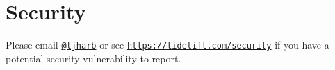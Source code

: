 \chapter{Security }
\hypertarget{md__c_1_2_users_2saket_2_one_drive_2_desktop_2e_pathshala_2epathshala-_web_2node__modules_2resolve_2_s_e_c_u_r_i_t_y}{}\label{md__c_1_2_users_2saket_2_one_drive_2_desktop_2e_pathshala_2epathshala-_web_2node__modules_2resolve_2_s_e_c_u_r_i_t_y}
\label{md__c_1_2_users_2saket_2_one_drive_2_desktop_2e_pathshala_2epathshala-_web_2node__modules_2resolve_2_s_e_c_u_r_i_t_y_autotoc_md13317}%
%


Please email \href{https://github.com/ljharb}{\texttt{@ljharb}} or see \href{https://tidelift.com/security}{\texttt{https\+://tidelift.\+com/security}} if you have a potential security vulnerability to report. 